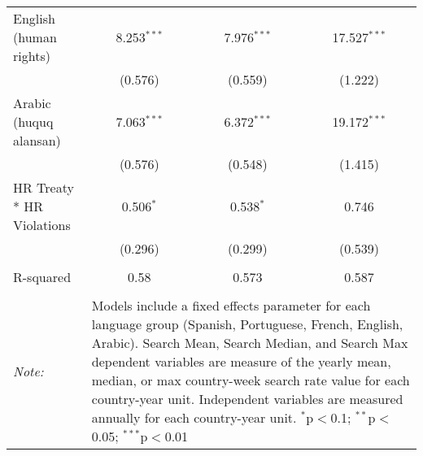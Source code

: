 \begin{table}[!htbp]
\begin{tabular}{@{\extracolsep{5pt}}lccc}
  English (human rights) & 8.253$^{***}$ & 7.976$^{***}$ & 17.527$^{***}$ \\ 
  & (0.576) & (0.559) & (1.222) \\ 
  Arabic (huquq alansan) & 7.063$^{***}$ & 6.372$^{***}$ & 19.172$^{***}$ \\ 
  & (0.576) & (0.548) & (1.415) \\ 
  HR Treaty * HR Violations & 0.506$^{*}$ & 0.538$^{*}$ & 0.746 \\ 
  & (0.296) & (0.299) & (0.539) \\ 
 \hline \\[-1.8ex] 
R-squared  & 0.58 & 0.573 & 0.587 \\ 
\hline 
\hline \\[-1.8ex] 
\textit{Note:}  & \multicolumn{3}{l}{\parbox[t]{8cm}{Models include a fixed effects parameter for each language group (Spanish, Portuguese, French, English, Arabic). Search Mean, Search Median, and Search Max dependent variables are measure of the yearly mean, median, or max country-week search rate value for each country-year unit. Independent variables are measured annually for each country-year unit. $^{*}$p$<$0.1; $^{**}$p$<$0.05; $^{***}$p$<$0.01}} \\ 
\end{tabular} 
\end{table} 
